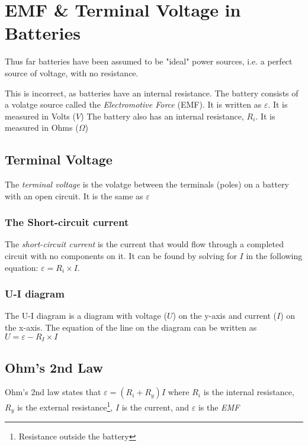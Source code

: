 \documentclass[11pt,twoside]{article}
\begin{document}
	\section{EMF \& Terminal Voltage in Batteries}
		Thus far batteries have been assumed to be "ideal" power sources, i.e. a perfect source of voltage, with no resistance.
		
		This is incorrect, as batteries have an internal resistance. The battery consists of a volatge source called the \emph{Electromotive Force} (EMF). It is written as $ \varepsilon $. It is measured in Volts ($V$) The battery also has an internal resistance, $R_i$. It is measured in Ohms ($\Omega$)
		
		\subsection{Terminal Voltage}
			The \emph{terminal voltage} is the volatge between the terminals (poles) on a battery with an open circuit. It is the same as $\varepsilon$
			
			\subsubsection{The Short-circuit current}
				The \emph{short-circuit current} is the current that would flow through a completed circuit with no components on it. It can be found by solving for $I$ in the following equation: $ \varepsilon = R_i \times I $.
				
			\subsubsection{U-I diagram}
				The U-I diagram is a diagram with voltage ($U$) on the y-axis and current ($I$) on the x-axis. The equation of the line on the diagram can be written as $U = \varepsilon - R_I \times I$
				
		\subsection{Ohm's 2nd Law}
			Ohm's 2nd law states that $\varepsilon = (R_i + R_y) I $ where $R_i$ is the internal resistance, $R_y$ is the external resistance\footnote{Resistance outside the battery}, $I$ is the current, and $\varepsilon$ is the \emph{EMF}
\end{document}
